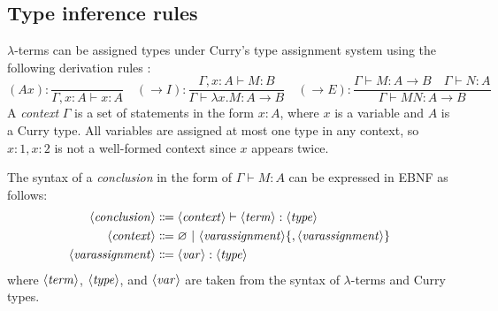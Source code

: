 \subsection{Type inference rules}\label{lambda:type-assignment}
$\lambda$-terms can be assigned types under Curry's type assignment system using the following derivation rules \cite{van-bakel:2022}:
\[
    (Ax): \frac{}{\Gamma, x:A \vdash x:A} \quad (\rightarrow I): \frac{\Gamma, x:A \vdash M:B}{\Gamma \vdash \lambda x. M: A \rightarrow B} \quad (\rightarrow E): \frac{\Gamma \vdash M: A \rightarrow B \quad \Gamma \vdash N: A}{\Gamma \vdash MN: A \rightarrow B}
\]
A \textit{context} $\Gamma$ is a set of statements in the form $x:A$, where $x$ is a variable and $A$ is a Curry type. All variables are assigned at most one type in any context, so $x:1, x:2$ is not a well-formed context since $x$ appears twice.

The syntax of a \textit{conclusion} in the form of $\Gamma \vdash M: A$ can be expressed in EBNF as follows:
\begin{align*}
    \langle\mathit{conclusion}\rangle &\Coloneqq \langle\mathit{context}\rangle \vdash \langle\mathit{term}\rangle : \langle\mathit{type}\rangle \\
    \langle\mathit{context}\rangle &\Coloneqq \varnothing \ |\  \langle\mathit{varassignment}\rangle \{, \langle\mathit{varassignment}\rangle \} \\
    \langle\mathit{varassignment}\rangle &\Coloneqq \langle\mathit{var}\rangle : \langle\mathit{type}\rangle
\end{align*}
where $\langle\mathit{term}\rangle$, $\langle\mathit{type}\rangle$, and $\langle\mathit{var}\rangle$ are taken from the syntax of $\lambda$-terms and Curry types.